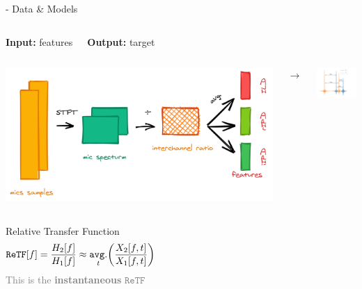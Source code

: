 \begin{frame}{\lantern - Data \& Models}

    \vspace{-3mm}
    \begin{block}{}
        \begin{columns}[onlytextwidth]
            \centering
            \textbf{Input:} features


            \centering
            \textbf{Output:} target
        \end{columns}

        \pause
        \begin{columns}[onlytextwidth]
            \centering
            \includegraphics[width=\textwidth]{figures/lantern.png}

            $\longrightarrow$

            \centering
            \includegraphics[width=40mm]{figures/rirs4.pdf}
        \end{columns}

        \begin{columns}[T,onlytextwidth]
            \centering
            Relative Transfer Function
            \begin{equation*}
                    \mathtt{ReTF}[f] = \frac{H_2[f]}{H_1[f]} \approx \timeavg \kparen{\frac{X_2[f,t]}{X_1[f,t]}}
            \end{equation*}
            \textcolor{gray}{\small This is the \textbf{instantaneous} $\mathtt{ReTF}$}


\end{columns}
\end{block}
\end{frame}
